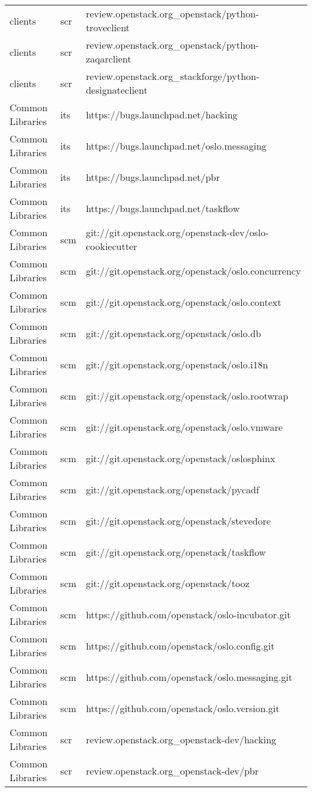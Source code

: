 \begin{center}
\begin{longtable}{|p{4cm}|p{1cm}|p{10cm}|}
clients&scr&review.openstack.org\_openstack/python-troveclient\\ 
clients&scr&review.openstack.org\_openstack/python-zaqarclient\\ 
clients&scr&review.openstack.org\_stackforge/python-designateclient\\ 
Common Libraries&its&https://bugs.launchpad.net/hacking\\ 
Common Libraries&its&https://bugs.launchpad.net/oslo.messaging\\ 
Common Libraries&its&https://bugs.launchpad.net/pbr\\ 
Common Libraries&its&https://bugs.launchpad.net/taskflow\\ 
Common Libraries&scm&git://git.openstack.org/openstack-dev/oslo-cookiecutter\\ 
Common Libraries&scm&git://git.openstack.org/openstack/oslo.concurrency\\ 
Common Libraries&scm&git://git.openstack.org/openstack/oslo.context\\ 
Common Libraries&scm&git://git.openstack.org/openstack/oslo.db\\ 
Common Libraries&scm&git://git.openstack.org/openstack/oslo.i18n\\ 
Common Libraries&scm&git://git.openstack.org/openstack/oslo.rootwrap\\ 
Common Libraries&scm&git://git.openstack.org/openstack/oslo.vmware\\ 
Common Libraries&scm&git://git.openstack.org/openstack/oslosphinx\\ 
Common Libraries&scm&git://git.openstack.org/openstack/pycadf\\ 
Common Libraries&scm&git://git.openstack.org/openstack/stevedore\\ 
Common Libraries&scm&git://git.openstack.org/openstack/taskflow\\ 
Common Libraries&scm&git://git.openstack.org/openstack/tooz\\ 
Common Libraries&scm&https://github.com/openstack/oslo-incubator.git\\ 
Common Libraries&scm&https://github.com/openstack/oslo.config.git\\ 
Common Libraries&scm&https://github.com/openstack/oslo.messaging.git\\ 
Common Libraries&scm&https://github.com/openstack/oslo.version.git\\ 
Common Libraries&scr&review.openstack.org\_openstack-dev/hacking\\ 
Common Libraries&scr&review.openstack.org\_openstack-dev/pbr\\ 

\end{longtable}
\end{center}

